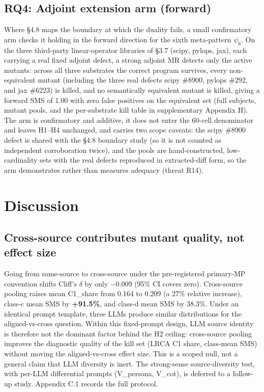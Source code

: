 \documentclass[manuscript,screen,review]{acmart}
\begin{document}
\subsection{RQ4: Adjoint extension arm (forward)}\label{rq4-adjoint-extension-arm}

Where §4.8 maps the boundary at which the duality fails, a small
confirmatory arm checks it holding in the forward direction for the sixth
meta-pattern $\psi_6$. On the three third-party linear-operator libraries
of §3.7 (scipy, pylops, jax), each carrying a real fixed adjoint defect, a
strong adjoint MR detects only the active mutants: across all three
substrates the correct program survives, every non-equivalent mutant
(including the three real defects scipy \#8900, pylops \#292, and jax
\#6223) is killed, and no semantically equivalent mutant is killed, giving
a forward SMS of 1.00 with zero false positives on the equivalent set
(full subjects, mutant pools, and the per-substrate kill table in
supplementary Appendix H). The arm is confirmatory and additive, it
does not enter the 60-cell denominator and leaves H1--H4 unchanged, and
carries two scope caveats: the scipy \#8900 defect is shared with the §4.8
boundary study (so it is not counted as independent corroboration twice),
and the pools are hand-constructed, low-cardinality sets with the real
defects reproduced in extracted-diff form, so the arm demonstrates rather
than measures adequacy (threat R14).


\section{Discussion}\label{discussion}

\subsection{Cross-source contributes mutant quality, not effect size}\label{cross-source-contributes-mutant-quality-not-effect-size}

Going from same-source to cross-source under the pre-registered
primary-MP convention shifts Cliff's $\delta$ by only $-$0.009 (95\% CI covers
zero). Cross-source pooling raises mean C1\_share from 0.164 to 0.209 (a
27\% relative increase), class-c mean SMS by \textbf{+91.5\%}, and
class-d mean SMS by 38.3\%. Under an identical prompt template, three
LLMs produce similar distributions for the aligned-vs-cross question.
Within this fixed-prompt design, LLM source identity is therefore not the
dominant factor behind the H2 ceiling: cross-source pooling improves the
diagnostic quality of the kill set (LRCA C1 share, class-mean SMS)
without moving the aligned-vs-cross effect size. This is a scoped null,
not a general claim that LLM diversity is inert. The strong-sense
source-diversity test, with per-LLM differential prompts (V\_persona,
V\_cot), is deferred to a follow-up study. Appendix C.1 records the full
protocol.
\end{document}
